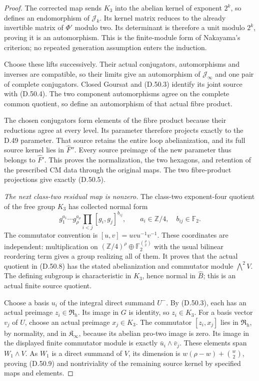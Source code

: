 \begin{proof}
The corrected map sends \(K_3\) into the abelian
kernel of exponent \(2^k\), so defines an
endomorphism of \(\mathcal J_k\).
Its kernel matrix reduces to the already
invertible matrix of \(\Phi'\) modulo two.
Its determinant is therefore a unit modulo
\(2^k\), proving it is an automorphism.
This is the finite-module form of Nakayama's
criterion; no repeated generation assumption
enters the induction.

Choose these lifts successively. Their actual
conjugators, automorphisms and inverses are
compatible, so their limits give an automorphism
of \(\mathcal J_\infty\) and one pair of complete
conjugators. Closed Goursat and (D.50.3) identify
its joint source with (D.50.4). The two component
automorphisms agree on the complete common
quotient, so define an automorphism of that
actual fibre product.

The chosen conjugators form elements of the
fibre product because their reductions agree
at every level. Its parameter therefore projects
exactly to the D.49 parameter. That source
retains the entire loop abelianization, and
its full source kernel lies in \(\widehat F''\).
Every source preimage of the new parameter
thus belongs to \(\widehat F'\). This proves
the normalization, the two hexagons, and
retention of the prescribed CM data through
the original maps. The two fibre-product
projections give exactly (D.50.5).

\emph{The next class-two residual map is nonzero.}
The class-two exponent-four quotient of the
free group \(K_3\) has collected normal form
\[
       g_1^{a_1}\cdots g_\rho^{a_\rho}
          \prod_{i<j}[g_i,g_j]^{b_{ij}},
       \qquad a_i\in\mathbb Z/4,\quad b_{ij}\in\mathbb F_2.
 \tag{D.50.19}
\]
The commutator convention is
\([u,v]=uvu^{-1}v^{-1}\).
These coordinates are independent: multiplication
on \((\mathbb Z/4)^\rho\oplus
\mathbb F_2^{\binom\rho2}\) with the usual
bilinear reordering term gives a group realizing
all of them. It proves that the actual quotient
in (D.50.8) has the stated abelianization and
commutator module \(\bigwedge^2V\).
The defining subgroup is characteristic in
\(K_3\), hence normal in \(\widehat B\); this
is an actual finite source quotient.

Choose a basis \(u_i\) of the integral direct
summand \(U^-\). By (D.50.3), each has an
actual preimage \(z_i\in\mathfrak R_h\).
Its image in \(G\) is identity, so \(z_i\in K_3\).
For a basis vector \(v_j\) of \(U\), choose
an actual preimage \(x_j\in K_3\).
The commutator \([z_i,x_j]\) lies in
\(\mathfrak R_h\), by normality, and in
\(\mathfrak K_\infty\), because its abelian
pro-two image is zero. Its image in the
displayed finite commutator module is exactly
\(\bar u_i\wedge\bar v_j\).
These elements span \(W_1\wedge V\).
As \(W_1\) is a direct summand of \(V\),
its dimension is
\(w(\rho-w)+\binom w2\), proving (D.50.9)
and nontriviality of the remaining source
kernel by specified maps and elements.


\end{proof}

